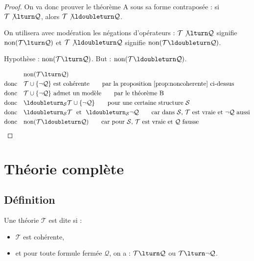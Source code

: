 \documentclass[11pt,class=report,crop=false]{standalone}
\begin{document}
\begin{proof}
	On va donc prouver le théorème A sous sa forme contraposée :
	si $\mathcal{T} \not\lturn \mathcal{Q}$, alors $\mathcal{T} \not\ldoubleturn \mathcal{Q}$.
	
	On utilisera avec modération les négations d'opérateurs : 
	$\mathcal{T} \not\lturn \mathcal{Q}$ signifie $\text{non}(\mathcal{T} \lturn \mathcal{Q})$
	et $\mathcal{T} \not\ldoubleturn \mathcal{Q}$ signifie $\text{non}(\mathcal{T} \ldoubleturn \mathcal{Q})$.	
	
	
	Hypothèse : $\text{non}(\mathcal{T} \lturn \mathcal{Q})$. 
	But : $\text{non}(\mathcal{T} \ldoubleturn \mathcal{Q})$.
	
\begin{align*}
	& \text{non}(\mathcal{T} \lturn \mathcal{Q}) \\
	\text{donc} \quad & \mathcal{T} \cup \{ \lnot \mathcal{Q} \} \text{ est cohérente} \qquad \text{par la proposition \ref{prop:noncoherente} ci-dessus} \\
	\text{donc} \quad & \mathcal{T} \cup \{ \lnot \mathcal{Q} \} \text{ admet un modèle} \qquad \text{par le théorème B} \\
	\text{donc} \quad & \ldoubleturn_{\mathcal{S}} \mathcal{T} \cup \{ \lnot \mathcal{Q} \} \qquad \text{pour une certaine structure $\mathcal{S}$} \\
	\text{donc} \quad & \ldoubleturn_{\mathcal{S}} \mathcal{T} \ \text{ et } \ \ldoubleturn_{\mathcal{S}} \lnot\mathcal{Q} \qquad \text{car dans $\mathcal{S}$, $\mathcal{T}$ est vraie et $\lnot \mathcal{Q}$ aussi} \\
	\text{donc} \quad & \text{non}(\mathcal{T} \ldoubleturn \mathcal{Q}) \qquad \text{car pour $\mathcal{S}$, $\mathcal{T}$ est vraie et $\mathcal{Q}$ fausse}
\end{align*}
	
\end{proof}


\section{Théorie complète}

\subsection{Définition}

\begin{definition}
	Une théorie $\mathcal{T}$ est dite  si :
	\begin{itemize}
		\item $\mathcal{T}$ est cohérente,
		\item et pour toute formule fermée $\mathcal{Q}$, on a : $\mathcal{T} \lturn \mathcal{Q}$ ou $\mathcal{T} \lturn \lnot \mathcal{Q}$.
	\end{itemize}
\end{definition}
\end{document}
